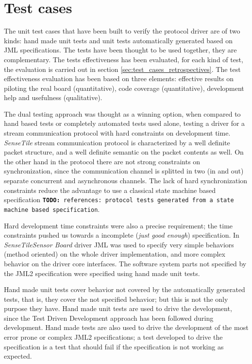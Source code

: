 \documentclass{article} \usepackage{times}
\newcommand{\todo}[1]{\texttt{\textbf{TODO:} #1}}
\newcommand{\ST}{\emph{SenseTile}\xspace}
\newcommand{\SB}{\emph{Sensor Board}\xspace}
\newcommand{\STSB}{\ST \SB\xspace}
\begin{document}
\section{Test cases}
\label{sec:test_cases}

The unit test cases that have been built to verify the protocol driver
are of two kinds: hand made unit tests and unit tests automatically
generated based on JML specifications.  The tests have been thought to
be used together, they are complementary.  The tests effectiveness has
been evaluated, for each kind of test, the evaluation is carried out
in section \ref{sec:test_cases_retrospectives}.  The test
effectiveness evaluation has been based on three elements: effective
results on piloting the real board (quantitative), code coverage
(quantitative), development help and usefulness (qualitative).

The dual testing approach was thought as a winning option, when 
compared to hand based tests or completely automated tests used alone, 
testing a driver for a stream communication protocol with hard constraints 
on development time.
\ST stream communication protocol is characterized by a well definite 
packet structure, and a well definite semantic on the packet contents 
as well.
On the other hand in the protocol there are not strong constraints on 
synchronization, since the communication channel is splitted in two (in and 
out) separate concurrent and asynchronous channels.
The lack of hard synchronization constraints reduce the advantage to use 
a classical state machine based specification \todo{references: 
protocol tests generated from a state machine based specification}.

Hard development time constraints were also a precise requirement; the time 
constraints pushed us towards a incomplete (\emph{just good enough}) 
specification.
In \STSB driver JML was used to specify very simple behaviors (method 
oriented) on the whole driver implementation, and more complex behavior on 
the driver core interfaces.
The software system parts not specified by the JML2 specification were 
specified using hand made unit tests.

Hand made unit tests cover behavior not covered by the automatically 
generated tests, that is, they cover the not specified behavior; but this 
is not the only purpose they have.
Hand made unit tests are used to drive the development, since the Test Driven 
Development approach\cite{beck2003test} has been followed during development.
Hand made tests are also used to drive the development of the most error 
prone or complex JML2 specifications; a test developed to drive the 
specification is a test that should fail if the specification is not working 
as expected.
\end{document}
